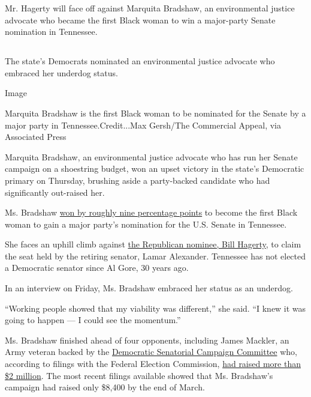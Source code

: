 Mr. Hagerty will face off against Marquita Bradshaw, an environmental
justice advocate who became the first Black woman to win a major-party
Senate nomination in Tennessee.

\hypertarget{section-8}{%
\subsection{}\label{section-8}}

The state's Democrats nominated an environmental justice advocate who
embraced her underdog status.

Image

Marquita Bradshaw is the first Black woman to be nominated for the
Senate by a major party in Tennessee.Credit...Max Gersh/The Commercial
Appeal, via Associated Press

Marquita Bradshaw, an environmental justice advocate who has run her
Senate campaign on a shoestring budget, won an upset victory in the
state's Democratic primary on Thursday, brushing aside a party-backed
candidate who had significantly out-raised her.

Ms. Bradshaw
\href{https://www.nytimes3xbfgragh.onion/interactive/2020/08/06/us/elections/results-tennessee-senate-primary-election.html}{won
by roughly nine percentage points} to become the first Black woman to
gain a major party's nomination for the U.S. Senate in Tennessee.

She faces an uphill climb against
\href{https://www.nytimes3xbfgragh.onion/2020/08/06/us/politics/tennessee-senate-primary-hagerty.html}{the
Republican nominee, Bill Hagerty}, to claim the seat held by the
retiring senator, Lamar Alexander. Tennessee has not elected a
Democratic senator since Al Gore, 30 years ago.

In an interview on Friday, Ms. Bradshaw embraced her status as an
underdog.

``Working people showed that my viability was different,'' she said. ``I
knew it was going to happen --- I could see the momentum.''

Ms. Bradshaw finished ahead of four opponents, including James Mackler,
an Army veteran backed by the
\href{https://www.dscc.org/news/dscc-endorses-james-mackler-in-tennessee-senate-race/}{Democratic
Senatorial Campaign Committee} who, according to filings with the
Federal Election Commission,
\href{https://www.fec.gov/data/committee/C00637850/}{had raised more
than \$2 million}. The most recent filings available showed that Ms.
Bradshaw's campaign had raised only \$8,400 by the end of March.

